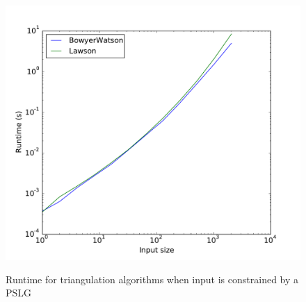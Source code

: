 \begin{figure}
    \includegraphics[width=\columnwidth]{../images/runtime_segments.pdf}
    \label{fig:triangulation-pslg-runtime}
    \caption{Runtime for triangulation algorithms when input is constrained by a PSLG}
\end{figure}
